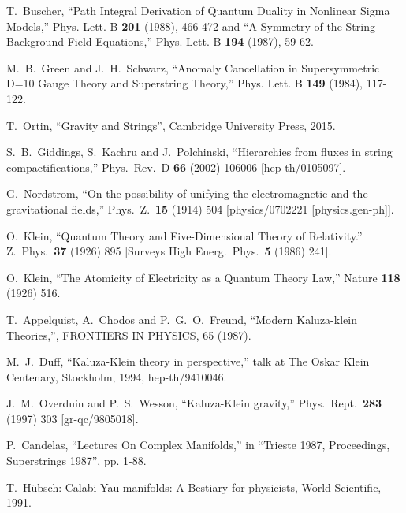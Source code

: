 \documentclass[12pt]{article}
\numberwithin{equation}{section}
\begin{document}
\begin{thebibliography}{999}
T.~Buscher,
``Path Integral Derivation of Quantum Duality in Nonlinear Sigma Models,''
Phys. Lett. B \textbf{201} (1988), 466-472 and
``A Symmetry of the String Background Field Equations,''
Phys. Lett. B \textbf{194} (1987), 59-62.

M.~B.~Green and J.~H.~Schwarz,
``Anomaly Cancellation in Supersymmetric D=10 Gauge Theory and Superstring Theory,''
Phys. Lett. B \textbf{149} (1984), 117-122.

T.~Ortin, ``Gravity and Strings'', Cambridge University Press, 2015.

  S.~B.~Giddings, S.~Kachru and J.~Polchinski,
  ``Hierarchies from fluxes in string compactifications,''
  Phys.\ Rev.\ D {\bf 66} (2002) 106006
  [hep-th/0105097].

  G.~Nordstrom, ``On the possibility of unifying the electromagnetic and 
  the gravitational fields,'' 
  Phys.\ Z.\  {\bf 15} (1914) 504 [physics/0702221 [physics.gen-ph]].

  O.~Klein, ``Quantum Theory and Five-Dimensional Theory of Relativity.''
  Z.\ Phys.\  {\bf 37} (1926) 895 [Surveys High Energ.\ Phys.\  {\bf 5} 
  (1986) 241].

  O.~Klein, ``The Atomicity of Electricity as a Quantum Theory Law,''
  Nature {\bf 118} (1926) 516.

  T.~Appelquist, A.~Chodos and P.~G.~O.~Freund,
  ``Modern Kaluza-klein Theories,'', FRONTIERS IN PHYSICS, 65 (1987).

  M.~J.~Duff, ``Kaluza-Klein theory in perspective,'' talk at The Oskar Klein
  Centenary, Stockholm, 1994, hep-th/9410046.

  J.~M.~Overduin and P.~S.~Wesson, ``Kaluza-Klein gravity,'' 
  Phys.\ Rept.\  {\bf 283} (1997) 303 [gr-qc/9805018].

  P.~Candelas, ``Lectures On Complex Manifolds,''
  in ``Trieste 1987, Proceedings, Superstrings 1987'', pp. 1-88.

 T.~H\"ubsch: Calabi-Yau manifolds: A Bestiary for physicists, World Scientific, 1991.
  

\end{thebibliography}
\end{document}
